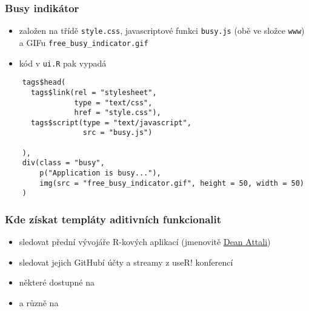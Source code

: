 \documentclass[t]{beamer}
\begin{document}

\begin{frame}[fragile]
  \frametitle{Busy indikátor}
  \begin{itemize}
    \item založen na třídě \texttt{style.css}, javascriptové funkci
    \texttt{busy.js} (obě ve složce \texttt{www}) a GIFu
    \texttt{free\_busy\_indicator.gif}
    \item kód v \texttt{ui.R} pak vypadá
  \end{itemize}
  \begin{lstlisting}
    tags$head(
      tags$link(rel = "stylesheet",
                type = "text/css",
                href = "style.css"),
      tags$script(type = "text/javascript",
                  src = "busy.js")
    
    ),
    div(class = "busy",
        p("Application is busy..."),
        img(src = "free_busy_indicator.gif", height = 50, width = 50)
    )
  \end{lstlisting}
\end{frame}



\begin{frame}
  \frametitle{Kde získat templáty aditivních funkcionalit}
  \begin{itemize}
    \item sledovat přední vývojáře \textsf{R}-kových aplikací
    (jmenovitě \href{http://deanattali.com/}{Dean Attali})
    \item sledovat jejich GitHubí účty a streamy z use\textsf{R}! konferencí
    \item některé dostupné na
  \end{itemize}
  \begin{center}
    \href{https://github.com/LStepanek/Vyvoj\_aplikaci\_v\_R/}{%
    }
  \begin{itemize}
    \item a různě na
  \end{itemize}
    \href{https://github.com/LStepanek/}{%
    }
  \end{center}
\end{frame}


\end{document}
